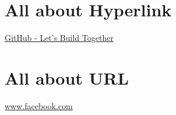 \documentclass{article}
\begin{document}
\section{All about Hyperlink}
\href{www.github.com}{GitHub - Let's Build Together}

\section{All about URL}
\url{www.facebook.com}
\end{document}
